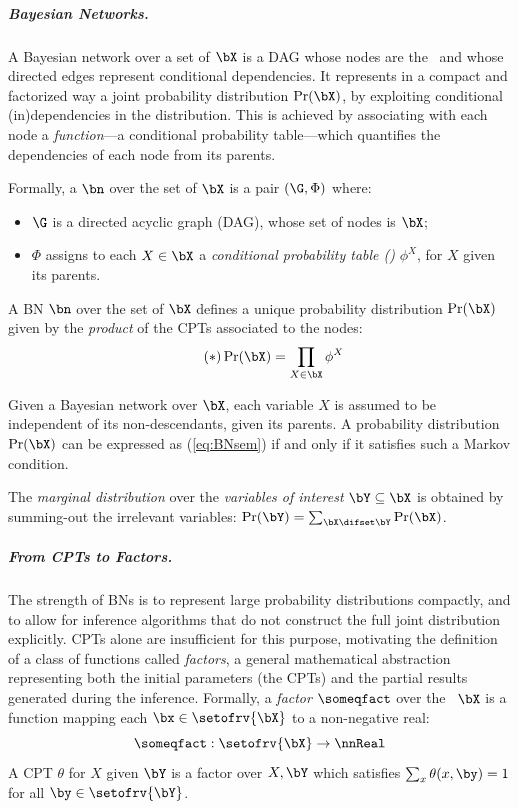 \subparagraph{Bayesian Networks.}

A Bayesian network over a set of \rvs $\bX$ is a DAG whose nodes are the \rvs\ and whose directed edges represent conditional dependencies.
It represents in a compact and factorized way a joint probability distribution $\Pr(\bX)$, by exploiting conditional (in)dependencies in the distribution.
This is achieved by associating with each node a \emph{function}---a conditional probability table---which quantifies the dependencies of each node from its parents.

Formally, a  $\bn$ over the set of \rvs $\bX$ is a pair $(\G,\Phi)$ where:
\begin{itemize}
\item $\G$ is a directed acyclic graph (DAG), whose set of nodes is $\bX$;
\item $\Phi$ assigns to each $X\in\bX$ a \emph{conditional probability table (\cpt)} $\phi^X$, for $X$ given its parents.
\end{itemize}

\begin{theorem}
\label{lem:BNsem}
A BN $\bn$ over the set of \rvs $\bX$ defines a unique probability distribution $\Pr(\bX)$ given by the \emph{product} of the CPTs associated to the nodes:
\begin{equation}
\label{eq:BNsem}
\tag{$\ast$}
\Pr(\bX) = \prod_{X\in \bX} \phi^X
\end{equation}
\end{theorem}

\begin{remark}
Given a Bayesian network over $\bX$, each variable $X$ is assumed to be independent of its non-descendants, given its parents.
A probability distribution $\Pr(\bX)$ can be expressed as (\ref{eq:BNsem}) if and only if it satisfies such a Markov condition.
\end{remark}

The \emph{marginal distribution} over the \emph{variables of interest} $\bY \subseteq \bX$ is obtained by summing-out the irrelevant variables:
$\Pr(\bY)= \sum_{\bX\difset\bY} \Pr(\bX)$.
 
\subparagraph{From CPTs to Factors.}

The strength of BNs is to represent large probability distributions compactly, and to allow for inference algorithms that do not construct the full joint distribution explicitly.
CPTs alone are insufficient for this purpose, motivating the definition of a class of functions called \emph{factors}, a general mathematical abstraction representing both the initial parameters (the CPTs) and the partial results generated during the inference.
Formally, a \emph{factor} $\someqfact$ over the \rvs\ $\bX$ is a function mapping each $\bx\in\setofrv{\bX}$ to a non-negative real:
\begin{equation}
\label{eq:factor}
\someqfact:\setofrv{\bX}\to\nnReal
\end{equation}
A CPT $\theta$ for $X$ given $\bY$ is a factor over $X,\bY$ which satisfies $\sum_x \theta({x,\by}) = 1$ for all $\by\in\setofrv{\bY}$.

